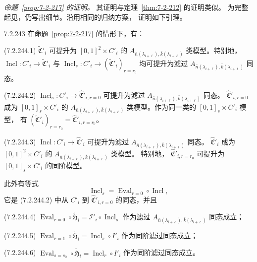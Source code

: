 
\par\noindent\textit{命题~\ref{prop:7-2-217} 的证明。}
其证明与定理~\ref{thm:7-2-212} 的证明类似。
为完整起见，仍写出细节。沿用相同的归纳方案，
证明如下引理。

\begin{lemma}{7.2.243}\label{lem:7-2-243}
在命题~\ref{prop:7-2-217} 的情形下，有：

\par\noindent\textup{(7.2.244.1)}
$\widetilde{\mathfrak C}'_i$
可提升为 $[0,1]^2\times C'_i$ 的
$A_{\bar n(\lambda_{i+\ell}),\bar k(\lambda_{i+\ell})}$
类模型。特别地，
$\operatorname{Incl}\colon C'_i\to
\widetilde{\mathfrak C}'_i$ 与
$\operatorname{Incl}_s\colon C'_i\to
(\widetilde{\mathfrak C}'_i)_{r=r_0}$
均可提升为滤过
$A_{\bar n(\lambda_{i+\ell}),\bar k(\lambda_{i+\ell})}$
同态。

\par\noindent\textup{(7.2.244.2)}
$\operatorname{Incl}_s\colon C'_i\to
\widehat{\mathfrak C}'_{i,r=0}$
可提升为滤过
$A_{\bar n(\lambda_{i+\ell}),\bar k(\lambda_{i+\ell})}$
同态。
$\widehat{\mathfrak C}'_{i,r=0}$
成为 $[0,1]_s\times C'_i$ 的
$A_{\bar n(\lambda_{i+\ell}),\bar k(\lambda_{i+\ell})}$
类模型。作为同一类的
$[0,1]_s\times C'_i$ 模型，
有
$(\widetilde{\mathfrak C}'_i)_{r=r_0}
=\widehat{\mathfrak C}'_{i,r=r_0}$。

\par\noindent\textup{(7.2.244.3)}
$\operatorname{Incl}\colon C'_i\to
\widehat{\mathfrak C}'_i$
可提升为滤过
$A_{\bar n(\lambda_{i+\ell}),\bar k(\lambda_{i+\ell})}$
同态。
$\widehat{\mathfrak C}'_i$
成为 $[0,1]^2\times C'_i$ 的
$A_{\bar n(\lambda_{i+\ell}),\bar k(\lambda_{i+\ell})}$
类模型。
特别地，
$\widehat{\mathfrak C}'_{i,r=r_0}$
可提升为 $[0,1]_s\times C'_i$
的同阶模型。

此外有等式
\[
\operatorname{Incl}_s
=\operatorname{Eval}_{r=0}\circ
\operatorname{Incl},
\]
它是 (7.2.244.2) 中从
$C'_i$ 到
$\widehat{\mathfrak C}'_{i,r=0}$
的同态，并且

\par\noindent\textup{(7.2.244.4)}
$\operatorname{Eval}_{r=0}\circ
\widetilde{\mathfrak H}_i
=\mathcal I'_i\circ\operatorname{Incl}_s$
作为滤过
$A_{\bar n(\lambda_{i+\ell}),\bar k(\lambda_{i+\ell})}$
同态成立；

\par\noindent\textup{(7.2.244.5)}
$\operatorname{Eval}_{r=1}\circ
\widetilde{\mathfrak H}_i
=\operatorname{Incl}_s\circ I'_i$
作为同阶滤过同态成立；

\par\noindent\textup{(7.2.244.6)}
$\operatorname{Eval}_{s=s_0}\circ
\widetilde{\mathfrak H}_i
=\operatorname{Incl}_r\circ I'_i$
作为同阶滤过同态成立。
\end{lemma}

